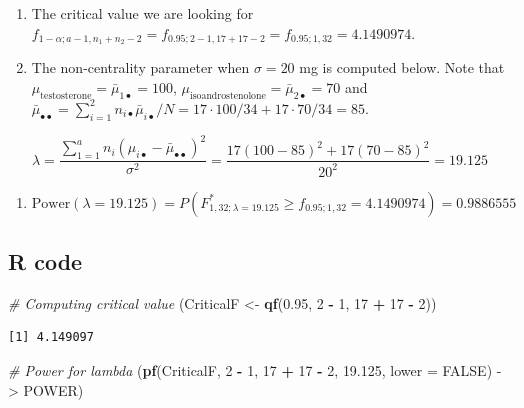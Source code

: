 \documentclass[
]{article}
\newenvironment{Shaded}{\begin{snugshade}}{\end{snugshade}}
\newcommand{\AttributeTok}[1]{\textcolor[rgb]{0.13,0.29,0.53}{#1}}
\newcommand{\CommentTok}[1]{\textcolor[rgb]{0.56,0.35,0.01}{\textit{#1}}}
\newcommand{\ConstantTok}[1]{\textcolor[rgb]{0.56,0.35,0.01}{#1}}
\newcommand{\DecValTok}[1]{\textcolor[rgb]{0.00,0.00,0.81}{#1}}
\newcommand{\FloatTok}[1]{\textcolor[rgb]{0.00,0.00,0.81}{#1}}
\newcommand{\FunctionTok}[1]{\textcolor[rgb]{0.13,0.29,0.53}{\textbf{#1}}}
\newcommand{\NormalTok}[1]{#1}
\newcommand{\OtherTok}[1]{\textcolor[rgb]{0.56,0.35,0.01}{#1}}
\newcommand{\SpecialCharTok}[1]{\textcolor[rgb]{0.81,0.36,0.00}{\textbf{#1}}}
\providecommand{\tightlist}{%
  \setlength{\itemsep}{0pt}\setlength{\parskip}{0pt}}
\begin{document}
\begin{enumerate}
\def\labelenumi{\alph{enumi})}
\item
  The critical value we are looking for \(f_{1 - \alpha; a - 1, n_1 + n_2 -2} = f_{0.95; 2 - 1, 17 + 17 -2} = f_{0.95; 1, 32} = 4.1490974\).
\item
  The non-centrality parameter when \(\sigma = 20\) mg is computed below. Note that \(\mu_{\text{testosterone}} = \bar{\mu}_{1\bullet} = 100\), \(\mu_{\text{isoandrostenolone}} = \bar{\mu}_{2\bullet} = 70\) and \(\bar{\mu}_{\bullet\bullet}=\sum_{i=1}^{2}n_{i\bullet}\bar{\mu}_{i\bullet}/N= 17\cdot 100/34 + 17\cdot 70/34 = 85.\)
\end{enumerate}

\begin{equation*}
\lambda = \frac{\sum_{1 = 1}^an_i(\mu_{i\bullet} - \bar{\mu}_{\bullet\bullet})^2}{\sigma^2} = \frac{17(100 - 85)^2 + 17(70 - 85)^2}{20^2} = 19.125
\end{equation*}

\begin{enumerate}
\def\labelenumi{\alph{enumi})}
\setcounter{enumi}{2}
\tightlist
\item
  \(\text{Power}(\lambda = 19.125) = P(F^*_{1, 32; \lambda = 19.125} \geq f_{0.95; 1, 32} = 4.1490974) = 0.9886555\)
\end{enumerate}

\hypertarget{r-code}{%
\subsection*{R code}\label{r-code}}

\begin{Shaded}
\begin{Highlighting}[]
\CommentTok{\# Computing critical value}
\NormalTok{(CriticalF }\OtherTok{\textless{}{-}} \FunctionTok{qf}\NormalTok{(}\FloatTok{0.95}\NormalTok{, }\DecValTok{2} \SpecialCharTok{{-}} \DecValTok{1}\NormalTok{, }\DecValTok{17} \SpecialCharTok{+} \DecValTok{17} \SpecialCharTok{{-}} \DecValTok{2}\NormalTok{))}
\end{Highlighting}
\end{Shaded}

\begin{verbatim}
[1] 4.149097
\end{verbatim}

\begin{Shaded}
\begin{Highlighting}[]
\CommentTok{\# Power for lambda}
\NormalTok{(}\FunctionTok{pf}\NormalTok{(CriticalF, }\DecValTok{2} \SpecialCharTok{{-}} \DecValTok{1}\NormalTok{, }\DecValTok{17} \SpecialCharTok{+} \DecValTok{17} \SpecialCharTok{{-}} \DecValTok{2}\NormalTok{, }\FloatTok{19.125}\NormalTok{, }\AttributeTok{lower =} \ConstantTok{FALSE}\NormalTok{) }\OtherTok{{-}\textgreater{}}\NormalTok{ POWER)}
\end{Highlighting}
\end{Shaded}
\end{document}
